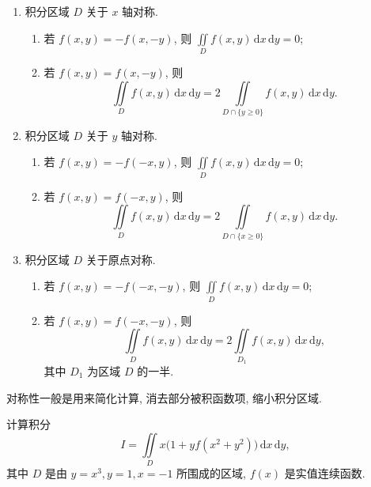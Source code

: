 \documentclass[../../数学分析培优讲义.tex]{subfiles}
\begin{document}
\begin{theorem}
\begin{enumerate}[label=(\arabic*)]
    \item 积分区域 $D$ 关于 $x$ 轴对称.
    \begin{enumerate}[label=(\roman*)]
        \item 若 $f(x,y)=-f(x,-y)$, 则 $\displaystyle\iint\limits_Df(x,y)\,\mathrm{d}x\,\mathrm{d}y=0$;
        \item 若 $f(x,y)=f(x,-y)$, 则
        \[
            \iint\limits_Df(x,y)\,\mathrm{d}x\,\mathrm{d}y
            =2\iint\limits_{D\cap\{y\geq0\}}f(x,y)\,\mathrm{d}x\,\mathrm{d}y.
        \]
    \end{enumerate}

    \item 积分区域 $D$ 关于 $y$ 轴对称.
    \begin{enumerate}[label=(\roman*)]
        \item 若 $f(x,y)=-f(-x,y)$, 则 $\displaystyle\iint\limits_Df(x,y)\,\mathrm{d}x\,\mathrm{d}y=0$;
        \item 若 $f(x,y)=f(-x,y)$, 则
        \[
            \iint\limits_Df(x,y)\,\mathrm{d}x\,\mathrm{d}y
            =2\iint\limits_{D\cap\{x\geq0\}}f(x,y)\,\mathrm{d}x\,\mathrm{d}y.
        \]
    \end{enumerate}

    \item 积分区域 $D$ 关于原点对称.
    \begin{enumerate}[label=(\roman*)]
        \item 若 $f(x,y)=-f(-x,-y)$, 则 $\displaystyle\iint\limits_Df(x,y)\,\mathrm{d}x\,\mathrm{d}y=0$;
        \item 若 $f(x,y)=f(-x,-y)$, 则
        \[
            \iint\limits_Df(x,y)\,\mathrm{d}x\,\mathrm{d}y
            =2\iint\limits_{D_1}f(x,y)\,\mathrm{d}x\,\mathrm{d}y,
        \]
        其中 $D_1$ 为区域 $D$ 的一半.
    \end{enumerate}
\end{enumerate}
\end{theorem}

\begin{remark}
对称性一般是用来简化计算, 消去部分被积函数项, 缩小积分区域.
\end{remark}

\begin{example}
计算积分
\[
    I=\iint\limits_Dx\bigl(1+yf(x^2+y^2)\bigr)\,\mathrm{d}x\,\mathrm{d}y,
\]
其中 $D$ 是由 $y=x^3,y=1,x=-1$ 所围成的区域, $f(x)$ 是实值连续函数.
\end{example}
\exampleblank
\end{document}
